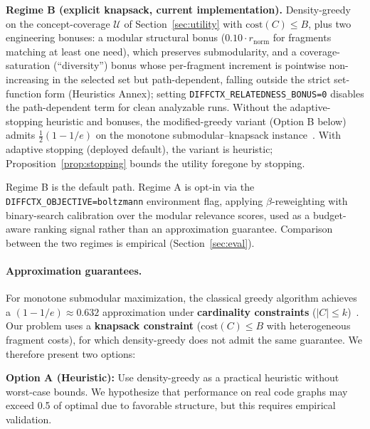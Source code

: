 \documentclass[11pt, a4paper]{article}
\begin{document}
\textbf{Regime B (explicit knapsack, current implementation).} Density-greedy on the concept-coverage $\mathcal{U}$ of Section~\ref{sec:utility} with $\mathrm{cost}(C) \leq B$, plus two engineering bonuses: a modular structural bonus ($0.10 \cdot r_{\mathrm{norm}}$ for fragments matching at least one need), which preserves submodularity, and a coverage-saturation (``diversity'') bonus whose per-fragment increment is pointwise non-increasing in the selected set but path-dependent, falling outside the strict set-function form (Heuristics Annex); setting \texttt{DIFFCTX\_RELATEDNESS\_BONUS=0} disables the path-dependent term for clean analyzable runs. Without the adaptive-stopping heuristic and bonuses, the modified-greedy variant (Option B below) admits $\frac{1}{2}(1-1/e)$ on the monotone submodular--knapsack instance~\cite{khuller1999budgeted}. With adaptive stopping (deployed default), the variant is heuristic; Proposition~\ref{prop:stopping} bounds the utility foregone by stopping.

Regime B is the default path. Regime A is opt-in via the \texttt{DIFFCTX\_OBJECTIVE=boltzmann} environment flag, applying $\beta$-reweighting with binary-search calibration over the modular relevance scores, used as a budget-aware ranking signal rather than an approximation guarantee. Comparison between the two regimes is empirical (Section~\ref{sec:eval}).

\paragraph{Approximation guarantees.} For monotone submodular maximization, the classical greedy algorithm achieves a $(1-1/e) \approx 0.632$ approximation under \textbf{cardinality constraints} ($|C| \leq k$)~\cite{nemhauser1978analysis}. Our problem uses a \textbf{knapsack constraint} ($\mathrm{cost}(C) \leq B$ with heterogeneous fragment costs), for which density-greedy does not admit the same guarantee. We therefore present two options:

\textbf{Option A (Heuristic):} Use density-greedy as a practical heuristic without worst-case bounds. We hypothesize that performance on real code graphs may exceed 0.5 of optimal due to favorable structure, but this requires empirical validation.
\end{document}
